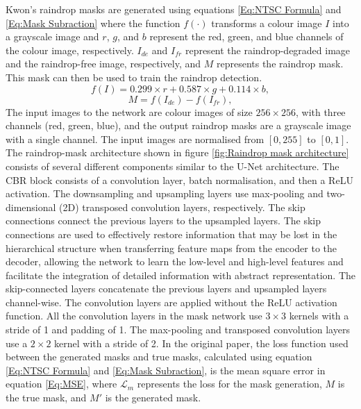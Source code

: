 \documentclass[11pt]{ociamthesis}  %
\begin{document}
Kwon's raindrop masks are generated using equations \ref{Eq:NTSC Formula} and \ref{Eq:Mask Subraction} where the function $f(\cdot)$ transforms a colour image $I$ into a grayscale image and $r$, $g$, and $b$ represent the red, green, and blue channels of the colour image, respectively. $I_{de}$ and $I_{fr}$ represent the raindrop-degraded image and the raindrop-free image, respectively, and $M$ represents the raindrop mask. This mask can then be used to train the raindrop detection.
\noindent
\begin{equation}
f(I) = 0.299 \times r +0.587 \times g+0.114 \times b, 
\label{Eq:NTSC Formula}
\end{equation}
\noindent
\begin{equation} 
M = f(I_{de})-f(I_{fr}),
\label{Eq:Mask Subraction}
\end{equation}
\noindent
The input images to the network are colour images of size $256 \times 256$, with three channels (red, green, blue), and the output raindrop masks are a grayscale image with a single channel. The input images are normalised from $[0,255]$ to $[0,1]$. The raindrop-mask architecture shown in figure \ref{fig:Raindrop mask architecture} consists of several different components similar to the U-Net architecture. The CBR block consists of a convolution layer, batch normalisation, and then a ReLU activation. The downsampling and upsampling layers use max-pooling and two-dimensional (2D) transposed convolution layers, respectively. The skip connections connect the previous layers to the upsampled layers. The skip connections are used to effectively restore information that may be lost in the hierarchical structure when transferring feature maps from the encoder to the decoder, allowing the network to learn the low-level and high-level features and facilitate the integration of detailed information with abstract representation. The skip-connected layers concatenate the previous layers and upsampled layers channel-wise. The convolution layers are applied without the ReLU activation function. All the convolution layers in the mask network use $3 \times 3$ kernels with a stride of 1 and padding of 1. The max-pooling and transposed convolution layers use a $2 \times 2$ kernel with a stride of 2. In the original paper, the loss function used between the generated masks and true masks, calculated using equation \ref{Eq:NTSC Formula} and \ref{Eq:Mask Subraction}, is the mean square error in equation \ref{Eq:MSE}, where $\mathcal{L}_m$ represents the loss for the mask generation, $M$ is the true mask, and $M'$ is the generated mask.
\end{document}
